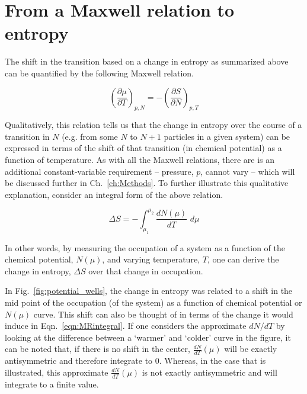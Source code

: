 \section{From a Maxwell relation to entropy}
\label{sec:mrtoentropy}

The shift in the transition based on a change in entropy as summarized above can be quantified by the following Maxwell relation.

\begin{equation}
	\label{eqn:MR}
	\left( \frac{\partial \mu }{\partial T} \right)_{p,N} = -\left( \frac{\partial S}{\partial N} \right)_{p,T}
\end{equation}


Qualitatively, this relation tells us that the change in entropy over the course of a transition in $N$ (e.g. from some $N$ to $N+1$ particles in a given system) can be expressed in terms of the shift of that transition (in chemical potential) as a function of temperature. As with all the Maxwell relations, there are is an additional constant-variable requirement -- pressure, $p$, cannot vary -- which will be discussed further in Ch.~\ref{ch:Methods}. To further illustrate this qualitative explanation, consider an integral form of the above relation.

\begin{equation}
	\label{eqn:MRintegral}
	\Delta S = - \int_{\mu_1}^{\mu_2} \frac{dN(\mu)}{dT}\,\, d\mu
\end{equation}

In other words, by measuring the occupation of a system as a function of the chemical potential, $N(\mu)$, and varying temperature, $T$, one can derive the change in entropy, $\Delta S$ over that change in occupation. 

In Fig.~\ref{fig:potential_wells}, the change in entropy was related to a shift in the mid point of the occupation (of the system) as a function of chemical potential or $N(\mu)$ curve. This shift can also be thought of in terms of the change it would induce in Eqn.~\ref{eqn:MRintegral}. If one considers the approximate $dN/dT$ by looking at the difference between a `warmer' and `colder' curve in the figure, it can be noted that, if there is no shift in the center, $\frac{dN}{dT} (\mu)$ will be exactly antisymmetric and therefore integrate to 0. Whereas, in the case that is illustrated, this approximate $\frac{dN}{dT} (\mu)$  is not exactly antisymmetric and will integrate to a finite value.


